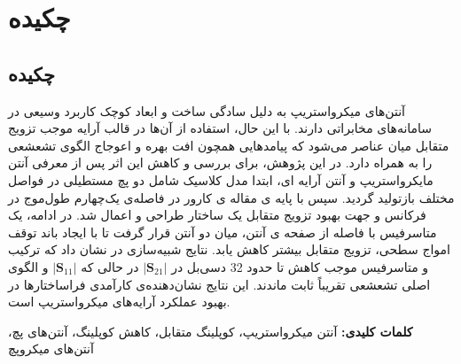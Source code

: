 \chapter*{چکیده}
\thispagestyle{empty}
\section*{چکیده}

آنتن‌های میکرواستریپ به دلیل سادگی ساخت و ابعاد کوچک کاربرد وسیعی در سامانه‌های مخابراتی دارند. با این حال، استفاده از آن‌ها در قالب آرایه موجب تزویج متقابل میان عناصر می‌شود که پیامدهایی همچون افت بهره و اعوجاج الگوی تشعشعی را به همراه دارد. در این پژوهش، برای بررسی و کاهش این اثر پس از معرفی آنتن مایکرواستریپ و آنتن آرایه ای، ابتدا مدل کلاسیک  شامل دو پچ مستطیلی در فواصل مختلف بازتولید گردید. سپس با پایه ی مقاله ی کارور در فاصله‌ی یک‌چهارم طول‌موج در فرکانس
   و   جهت بهبود تزویج متقابل     یک ساختار
       طراحی و اعمال شد. در ادامه، یک متاسرفیس با فاصله از صفحه ی آنتن، میان دو آنتن قرار گرفت تا با ایجاد باند توقف امواج سطحی، تزویج متقابل بیشتر کاهش یابد. نتایج شبیه‌سازی در 
        نشان داد که ترکیب
          و متاسرفیس موجب کاهش تا حدود 32 دسی‌بل در 
$\vert\bm{S}_{21}\vert$
در حالی که 
$\vert\bm{S}_{11}\vert$
 و الگوی اصلی تشعشعی تقریباً ثابت ماندند. این نتایج نشان‌دهنده‌ی کارآمدی فراساختارها در بهبود عملکرد آرایه‌های میکرواستریپ است.
 
 
\textbf{کلمات کلیدی:}
آنتن میکرواستریپ، کوپلینگ متقابل، کاهش کوپلینگ، آنتن‌های پچ، آنتن‌های میکروپچ

